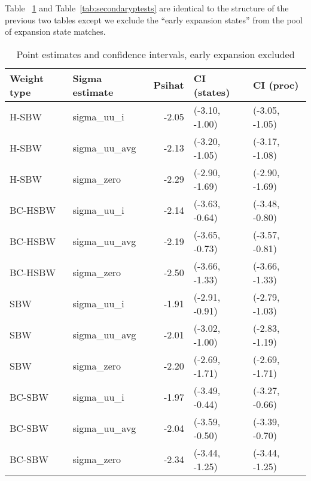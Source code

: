 Table ~\ref{tab:confintmainc2} and Table~\ref{tab:secondaryptests} are identical to the structure of the previous two tables except we exclude the ``early expansion states'' from the pool of expansion state matches. 

\begin{table}[ht]
\centering
\caption{Point estimates and confidence intervals, early expansion excluded}
\label{tab:confintmainc2}
\begin{tabular}{llrll}
  \hline
Weight type & Sigma estimate & Psihat & CI (states) & CI (proc) \\ 
  \hline
H-SBW & sigma\_uu\_i & -2.05 & (-3.10, -1.00) & (-3.05, -1.05) \\ 
  H-SBW & sigma\_uu\_avg & -2.13 & (-3.20, -1.05) & (-3.17, -1.08) \\ 
  H-SBW & sigma\_zero & -2.29 & (-2.90, -1.69) & (-2.90, -1.69) \\ 
  BC-HSBW & sigma\_uu\_i & -2.14 & (-3.63, -0.64) & (-3.48, -0.80) \\ 
  BC-HSBW & sigma\_uu\_avg & -2.19 & (-3.65, -0.73) & (-3.57, -0.81) \\ 
  BC-HSBW & sigma\_zero & -2.50 & (-3.66, -1.33) & (-3.66, -1.33) \\ 
  SBW & sigma\_uu\_i & -1.91 & (-2.91, -0.91) & (-2.79, -1.03) \\ 
  SBW & sigma\_uu\_avg & -2.01 & (-3.02, -1.00) & (-2.83, -1.19) \\ 
  SBW & sigma\_zero & -2.20 & (-2.69, -1.71) & (-2.69, -1.71) \\ 
  BC-SBW & sigma\_uu\_i & -1.97 & (-3.49, -0.44) & (-3.27, -0.66) \\ 
  BC-SBW & sigma\_uu\_avg & -2.04 & (-3.59, -0.50) & (-3.39, -0.70) \\ 
  BC-SBW & sigma\_zero & -2.34 & (-3.44, -1.25) & (-3.44, -1.25) \\ 
   \hline
\end{tabular}
\end{table}

